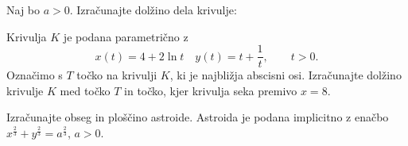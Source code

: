 \documentclass[11pt,a4paper]{exam}
\renewcommand{\leq}{\leqslant} %
\renewcommand{\{}{\lbrace}
\renewcommand{\}}{\rbrace}
\begin{document}
\begin{questions}
\question 
Naj bo $a > 0$. Izračunajte dolžino dela krivulje:

\question
Krivulja $K$ je podana parametrično z \[x(t) = 4+2 \ln t \quad y(t) = t + \frac{1}{t}, \qquad t > 0.\] Označimo s $T$ točko na krivulji $K$, ki je najbližja abscisni osi. Izračunajte dolžino krivulje $K$ med točko $T$ in točko, kjer krivulja seka premivo $x = 8$.

\question 
Izračunajte obseg in ploščino astroide. Astroida je podana implicitno z enačbo $x^{\frac{2}{3}} + y^{\frac{2}{3}} = a^{\frac{2}{3}}$, $a > 0$.

\end{questions}
\end{document}
